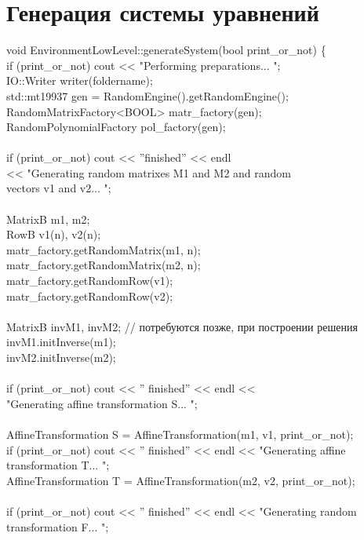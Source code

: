 \section{Генерация системы уравнений}
void EnvironmentLowLevel::generateSystem(bool print\_or\_not)
\{
\\
	if (print\_or\_not) cout << "Performing preparations... "; \\
	IO::Writer writer(foldername);\\
	std::mt19937 gen = RandomEngine().getRandomEngine();\\
	RandomMatrixFactory<BOOL> matr\_factory(gen);\\
	RandomPolynomialFactory pol\_factory(gen);\\
	\\
	if (print\_or\_not) cout << ''finished'' << endl\\
	<< "Generating random matrixes M1 and M2 and random\\ vectors v1 and v2... ";\\
	\\
	MatrixB m1, m2;\\
	RowB v1(n), v2(n);\\
	matr\_factory.getRandomMatrix(m1, n);\\
	matr\_factory.getRandomMatrix(m2, n);\\
	matr\_factory.getRandomRow(v1);\\
	matr\_factory.getRandomRow(v2);\\
	\\
	MatrixB invM1, invM2; // потребуются позже, при построении решения\\
	invM1.initInverse(m1);\\
	invM2.initInverse(m2);\\
	\\
	if (print\_or\_not) cout << '' finished'' << endl <<\\ "Generating affine transformation S... ";\\
	\\
	AffineTransformation S = AffineTransformation(m1, v1, print\_or\_not);\\
	if (print\_or\_not) cout << '' finished'' << endl << "Generating affine transformation T... ";\\
	AffineTransformation T = AffineTransformation(m2, v2, print\_or\_not);\\
	\\
	if (print\_or\_not) cout << '' finished'' << endl << "Generating random transformation F... ";\\
